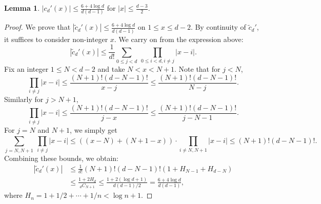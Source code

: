 \documentclass[12pt]{amsart}
\theoremstyle{definition}
\newtheorem{lemma}[theorem]{Lemma}
\begin{document}
\begin{lemma}
    $|c_{d}'(x)| \leq  \frac{6+4\log d}{d(d-1)}$ for $|x|\leq \frac{d-3}{2}$.
\label{lem:second_cd_derivative_bound}
\end{lemma}
\begin{proof}
    We prove that $|\tilde{c}_d'(x)| \leq \frac{6+4\log d}{d(d-1)} $ on $1\leq x\leq d-2$. By continuity of $\tilde{c}_d'$, it suffices to consider non-integer $x$. We carry on from the expression above:
    $$ |\tilde{c}_d'(x)| 
    \leq \frac{1}{d!} \sum_{0\leq j< d}^{}
    \ \prod_{0\leq i < d,i\neq j}^{} |x-i|.$$
    Fix an integer $1\leq N<d-2$ and take $N<x< N+1$. Note that for $j< N$,
    $$ \prod_{i\neq j}^{} |x-i| \leq \frac{(N+1)!(d-N-1)!}{x-j}
    \leq \frac{(N+1)!(d-N-1)!}{N-j}.$$
    Similarly for $j> N+1$, 
    $$ \prod_{i\neq j}^{} |x-i| \leq \frac{(N+1)!(d-N-1)!}{j-x}
    \leq \frac{(N+1)!(d-N-1)!}{j-N-1}.$$
    For $j=N$ and $N+1$, we simply get
    $$ \sum_{j=N,N+1}^{}
    \ \prod_{i\neq j}^{} |x-i| \leq ((x-N)+(N+1-x))\cdot \prod_{i\neq N,N+1}|x-i|\leq (N+1)!(d-N-1)!.$$
    Combining these bounds, we obtain:
    \begin{align*}
        |\tilde{c}_d'(x)| &\leq \frac{1}{d!}(N+1)!(d-N-1)!(1+H_{N-1}+H_{d-N}) \\
        &\leq \frac{1+2H_d}{ {}_{d}C_{N+1}} \leq \frac{1+2(\log d+1)}{d(d-1)/2} = \frac{6+4\log d}{d(d-1)},
    \end{align*}
    where $H_n =1+1/2+\cdots+1/n < \log n + 1$.
\end{proof}
\end{document}
